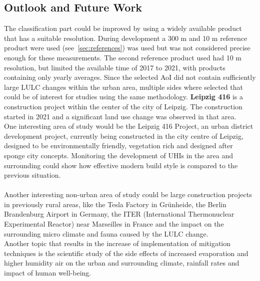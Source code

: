  
\subsection{Outlook and Future Work}\label{sec:future}

The classification part could be improved by using a widely available product that has a suitable resolution. 
During development a 300 m and 10 m reference product were used (see~\cref{sec:references}) was used but was not considered precise enough for these measurements.
The second reference product used had 10 m resolution, but limited the available time of 2017 to 2021, with products containing only yearly averages.
Since the selected \gls{AoI} did not contain sufficiently large \gls{LULC} changes within the urban area, multiple sides where selected that could be of interest for studies using the same methodology.
\textbf{Leipzig 416} is a construction project within the center of the city of Leipzig.
The construction started in 2021 and a significant land use change was observed in that area. \\
One interesting area of study would be the Leipzig 416 Project, an urban district development project, currently being constructed in the city centre of Leipzig, designed to be environmentally friendly, vegetation rich and designed after sponge city concepts.
Monitoring the development of \glspl{UHI} in the area and surrounding could show how effective modern build style is compared to the previous situation.\\
\\
Another interesting non-urban area of study could be large construction projects in previously rural areas, like the Tesla Factory in Grünheide, the Berlin Brandenburg Airport in Germany, the ITER (International Thermonuclear Experimental Reactor) near Marseilles in France and the impact on the surrounding micro climate and fauna caused by the \gls{LULC} change.
\\
Another topic that results in the increase of implementation of mitigation techniques is the scientific study of the side effects of increased evaporation and higher humidity air on the urban and surrounding climate, rainfall rates and impact of human well-being.
\\ 


